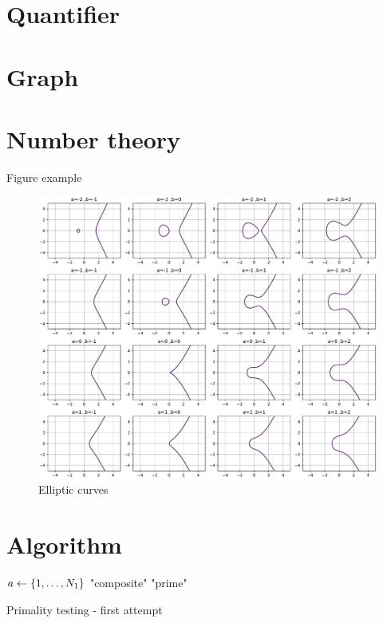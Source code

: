 \lipsum %

\section{Quantifier}
\lipsum %

\section{Graph}
\cite{babaiGraphIsomorphismQuasipolynomial2016}

\section{Number theory}
Figure example
\begin{figure}[!ht]
    \centering
    \includegraphics[width=1\linewidth]{./figure/elliptic_curves.pdf}
    \caption{Elliptic curves \cite{childsUniversalComputationQuantum2009} }
\end{figure}


\section{Algorithm}
\begin{algorithm}[H]
    \BlankLine
     {
        $a\leftarrow \qty{1,\dots,N_1}$\;
    {\Return "composite"}
    }
    \Return "prime"
    \caption{Primality testing - first attempt}
    \label{alg:miller_rabin}
\end{algorithm}
